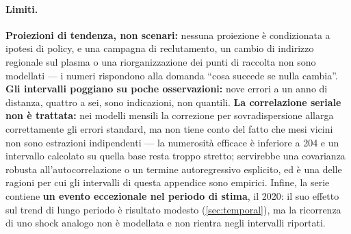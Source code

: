 \paragraph{Limiti.}
\textbf{Proiezioni di tendenza, non scenari:} nessuna proiezione è
condizionata a ipotesi di policy, e una campagna di reclutamento, un cambio di
indirizzo regionale sul plasma o una riorganizzazione dei punti di raccolta
non sono modellati --- i numeri rispondono alla domanda ``cosa succede se
nulla cambia''. \textbf{Gli intervalli poggiano su poche osservazioni:} nove
errori a un anno di distanza, quattro a sei, sono indicazioni, non quantili.
\textbf{La correlazione seriale non è trattata:} nei modelli mensili la
correzione per sovradispersione allarga correttamente gli errori standard, ma
non tiene conto del fatto che mesi vicini non sono estrazioni indipendenti ---
la numerosità efficace è inferiore a 204 e un intervallo calcolato su quella
base resta troppo stretto; servirebbe una covarianza robusta
all'autocorrelazione o un termine autoregressivo esplicito, ed è una delle
ragioni per cui gli intervalli di questa appendice sono empirici. Infine, la
serie contiene \textbf{un evento eccezionale nel periodo di stima}, il 2020:
il suo effetto sul trend di lungo periodo è risultato modesto
(\cref{sec:temporal}), ma la ricorrenza di uno shock analogo non è modellata e
non rientra negli intervalli riportati.

